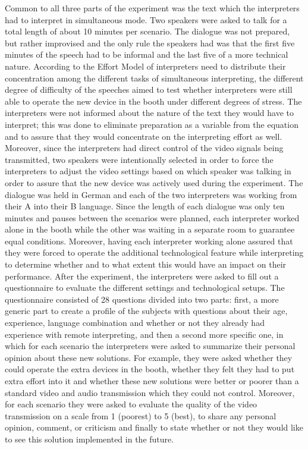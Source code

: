 \documentclass[output=paper]{langsci/langscibook}
\begin{document}
Common to all three parts of the experiment was the text which the interpreters had to interpret in simultaneous mode. Two speakers were asked to talk for a total length of about 10 minutes per scenario. The dialogue was not prepared, but rather improvised and the only rule the speakers had was that the first five minutes of the speech had to be informal and the last five of a more technical nature. According to the Effort Model of \citet{Gile2009} interpreters need to distribute their concentration among the different tasks of simultaneous interpreting, the different degree of difficulty of the speeches aimed to test whether interpreters were still able to operate the new device in the booth under different degrees of stress. The interpreters were not informed about the nature of the text they would have to interpret; this was done to eliminate preparation as a variable from the equation and to assure that they would concentrate on the interpreting effort as well. Moreover, since the interpreters had direct control of the video signals being transmitted, two speakers were intentionally selected in order to force the interpreters to adjust the video settings based on which speaker was talking in order to assure that the new device was actively used during the experiment. The dialogue was held in German and each of the two interpreters was working from their A into their B language. Since the length of each dialogue was only ten minutes and pauses between the scenarios were planned, each interpreter worked alone in the booth while the other was waiting in a separate room to guarantee equal conditions. Moreover, having each interpreter working alone assured that they were forced to operate the additional technological feature while interpreting to determine whether and to what extent this would have an impact on their performance. After the experiment, the interpreters were asked to fill out a questionnaire to evaluate the different settings and technological setups. The questionnaire consisted of 28 questions divided into two parts: first, a more generic part to create a profile of the subjects with questions about their age, experience, language combination and whether or not they already had experience with remote interpreting, and then a second more specific one, in which for each scenario the interpreters were asked to summarize their personal opinion about these new solutions. For example, they were asked whether they could operate the extra devices in the booth, whether they felt they had to put extra effort into it and whether these new solutions were better or poorer than a standard video and audio transmission which they could not control. Moreover, for each scenario they were asked to evaluate the quality of the video transmission on a scale from 1 (poorest) to 5 (best), to share any personal opinion, comment, or criticism and finally to state whether or not they would like to see this solution implemented in the future.
\end{document}
